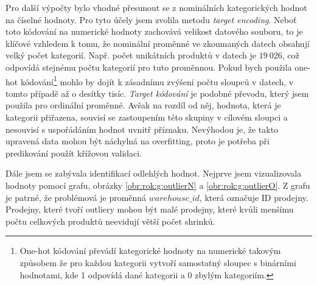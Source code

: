 Pro další výpočty bylo vhodné přesunout se z nominálních kategorických hodnot na číselné hodnoty. Pro tyto účely jsem zvolila metodu \emph{target encoding}.  %
Neboť toto kódování na numerické hodnoty zachovává velikost datového souboru, to je klíčové vzhledem k tomu, že nominální proměnné ve zkoumaných datech obsahují velký počet kategorií. Např. počet unikátních produktů v datech je $19\ 026$, což odpovídá stejnému počtu kategorií pro tuto proměnnou. Pokud bych použila one-hot kódování\footnote{One-hot kódování převádí kategorické hodnoty na numerické takovým způsobem že pro každou kategorii vytvoří samostatný sloupec s binárními hodnotami, kde 1 odpovídá dané kategorii a 0 zbylým kategoriím.}  mohlo by dojít k zásadnímu zvýšení počtu sloupců v datech, v tomto případě až o desítky tisíc. \emph{Target kódování} je podobné převodu, který jsem použila pro ordinální proměnné. Avšak na rozdíl od něj, hodnota, která je kategorii přiřazena, souvisí se zastoupením této skupiny v cílovém sloupci a nesouvisí s uspořádáním hodnot uvnitř příznaku. Nevýhodou je, že takto upravená data mohou být náchylná na overfitting, proto je potřeba při predikování použít křížovou validaci.\cite{encoding}


Dále jsem se zabývala identifikací odlehlých hodnot. Nejprve jsem vizualizovala hodnoty pomocí grafu, obrázky \ref*{obr:rok:g:outlierN} a \ref*{obr:rok:g:outlierO}. Z grafu je patrné, že problémová je proměnná $warehouse\_id$, která označuje ID prodejny. Prodejny, které tvoří outliery mohou být malé prodejny, které kvůli menšímu počtu celkových produktů neevidují větší počet shrinků. %

